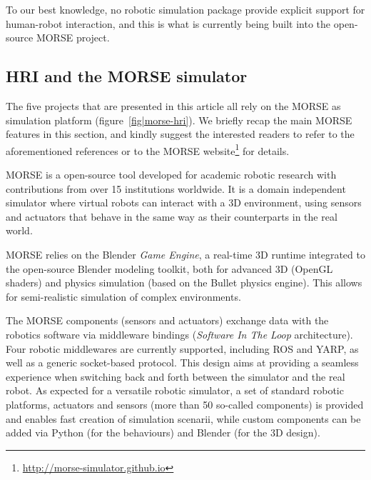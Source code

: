\documentclass[conference]{IEEEtran}
\begin{document}



To our best knowledge, no robotic simulation package provide explicit support
for human-robot interaction, and this is what is currently being built into the
open-source MORSE project.

\subsection*{HRI and the MORSE simulator}

The five projects that are presented in this article all rely on the MORSE as
simulation platform (figure~\ref{fig|morse-hri}). We briefly recap the main
MORSE features in this section, and kindly suggest the interested readers to
refer to the aforementioned references or to the MORSE
website\footnote{\url{http://morse-simulator.github.io}} for details.

MORSE is a open-source tool developed for academic robotic research with
contributions from over 15 institutions worldwide. It is a domain independent
simulator where virtual robots can interact with a 3D environment, using
sensors and actuators that behave in the same way as their counterparts in the
real world.

MORSE relies on the Blender \emph{Game Engine}, a real-time 3D runtime
integrated to the open-source Blender modeling toolkit, both for advanced 3D
(OpenGL shaders) and physics simulation (based on the {\sc Bullet} physics
engine). This allows for semi-realistic simulation of complex environments.

The MORSE components (sensors and actuators) exchange data with the robotics
software via middleware bindings (\emph{Software In The Loop} architecture).
Four robotic middlewares are currently supported, including ROS and YARP, as
well as a generic socket-based protocol. This design aims at providing a
seamless experience when switching back and forth between the simulator and the
real robot. As expected for a versatile robotic simulator, a set of standard
robotic platforms, actuators and sensors (more than 50 so-called components) is
provided and enables fast creation of simulation scenarii, while custom
components can be added via Python (for the behaviours) and Blender (for the 3D
design).
\end{document}
